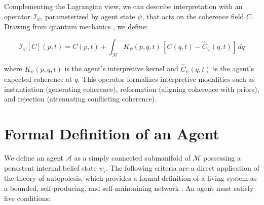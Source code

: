 Complementing the Lagrangian view, we can describe interpretation with an operator \(\mathcal{I}_{\psi}\), parameterized by agent state \(\psi\), that acts on the coherence field \(C\). Drawing from quantum mechanics \autocite{vonNeumann1955}, we define:

\begin{equation}
\mathcal{I}_{\psi}[C](p, t) = C(p, t) + \int_{\mathcal{M}} K_{\psi}(p, q, t)\, [C(q, t) - \hat{C}_{\psi}(q, t)]\, dq
\end{equation}

where \(K_{\psi}(p, q, t)\) is the agent's interpretive kernel and \(\hat{C}_{\psi}(q, t)\) is the agent's expected coherence at \(q\). This operator formalizes interpretive modalities such as instantiation (generating coherence), reformation (aligning coherence with priors), and rejection (attenuating conflicting coherence).

\section{Formal Definition of an Agent}

We define an agent \(\mathcal{A}\) as a simply connected submanifold of \(\mathcal{M}\) possessing a persistent internal belief state \(\psi_i\). The following criteria are a direct application of the theory of autopoiesis, which provides a formal definition of a living system as a bounded, self-producing, and self-maintaining network \autocite{MaturanaVarela1980}. An agent must satisfy five conditions:

